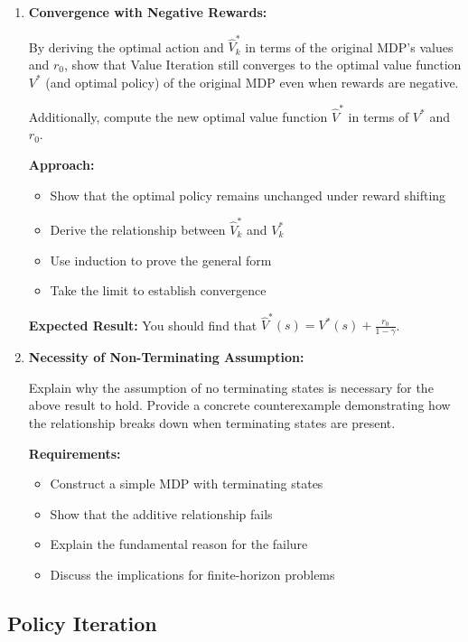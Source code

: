 \documentclass[12pt]{article}
\begin{document}
    \begin{enumerate}[resume*]
    \item \textbf{Convergence with Negative Rewards:}
    
    By deriving the optimal action and \( \hat{V}^*_k \) in terms of the original MDP's values and \( r_0 \), show that Value Iteration still converges to the optimal value function \( V^* \) (and optimal policy) of the original MDP even when rewards are negative.
    
    Additionally, compute the new optimal value function \( \hat{V}^* \) in terms of \( V^* \) and \( r_0 \).
    
    \textbf{Approach:}
    \begin{itemize}
        \item Show that the optimal policy remains unchanged under reward shifting
        \item Derive the relationship between \( \hat{V}^*_k \) and \( V^*_k \)
        \item Use induction to prove the general form
        \item Take the limit to establish convergence
    \end{itemize}
    
    \textbf{Expected Result:} You should find that \( \hat{V}^*(s) = V^*(s) + \frac{r_0}{1-\gamma} \).

    \item \textbf{Necessity of Non-Terminating Assumption:}
    
    Explain why the assumption of no terminating states is necessary for the above result to hold. Provide a concrete counterexample demonstrating how the relationship breaks down when terminating states are present.
    
    \textbf{Requirements:}
    \begin{itemize}
        \item Construct a simple MDP with terminating states
        \item Show that the additive relationship fails
        \item Explain the fundamental reason for the failure
        \item Discuss the implications for finite-horizon problems
    \end{itemize}
\end{enumerate}



\subsection{Policy Iteration}
\label{subsec:policy_iteration}
\end{document}
